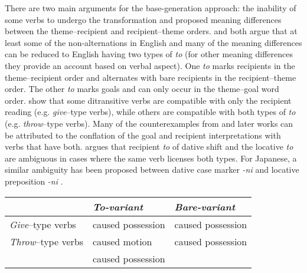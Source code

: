 There are two main arguments for the base-generation approach: the inability of some verbs to undergo the transformation and proposed meaning differences between the theme--recipient and recipient--theme orders. \cite{Levinson.2005} and \cite{Hovav.2008} both argue that at least some of the non-alternations in English and many of the meaning differences can be reduced to English having two types of \textit{to} (for other meaning differences they provide an account based on verbal aspect). One \textit{to} marks recipients in the theme--recipient order and alternates with bare recipients in the recipient--theme order. The other \textit{to} marks goals and can only occur in the theme--goal word order. \cite{Hovav.2008} show that some ditransitive verbs are compatible with only the recipient reading (e.g. \textit{give}--type verbs), while others are compatible with both types of \textit{to} (e.g. \textit{throw}--type verbs). Many of the counterexamples from \cite{Oehrle.1976} and later works can be attributed to the conflation of the goal and recipient interpretations with verbs that have both. \cite{Hallman.2015} argues that recipient \textit{to} of dative shift and the locative \textit{to} are ambiguous in cases where the same verb licenses both types. For Japanese, a similar ambiguity has been proposed between dative case marker \textit{-ni} and locative preposition \textit{-ni} \citep{Sadakane.1995,Kishimoto.2008}.
\begin{exe}
\ex \begin{tabular}{lll}
\hline
&\textit{To-variant} & \textit{Bare-variant}\\
\hline
\textit{Give}--type verbs &caused possession & caused possession\\
\textit{Throw}--type verbs &caused motion & caused possession\\
& caused possession & \\
\hline
\end{tabular}
\end{exe}%
